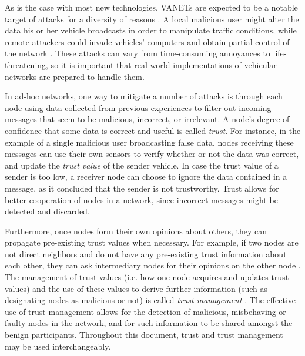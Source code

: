 As is the case with most new technologies, VANETs are expected to be a notable target of attacks for a diversity of reasons \citep{isaac2010security}.
A local malicious user might alter the data his or her vehicle broadcasts in order to manipulate traffic conditions, while remote attackers could invade vehicles' computers and obtain partial control of the network  \citep{garip2015congestion}.
These attacks can vary from time-consuming annoyances to life-threatening, so it is important that real-world implementations of vehicular networks are prepared to handle them.




In ad-hoc networks, one way to mitigate a number of attacks is through each node using data collected from previous experiences to filter out incoming messages that seem to be malicious, incorrect, or irrelevant.
A node's degree of confidence that some data is correct and useful is called \textit{trust}.
For instance, in the example of a single malicious user broadcasting false data, nodes receiving these messages can use their own sensors to verify whether or not the data was correct, and update the \textit{trust value} of the sender vehicle.
In case the trust value of a sender is too low, a receiver node can choose to ignore the data contained in a message, as it concluded that the sender is not trustworthy.
Trust allows for better cooperation of nodes in a network, since incorrect messages might be detected and discarded.

Furthermore, once nodes form their own opinions about others, they can propagate pre-existing trust values when necessary.
For example, if two nodes are not direct neighbors and do not have any pre-existing trust information about each other, they can ask intermediary nodes for their opinions on the other node \citep{wang2009trust}.
The management of trust values (i.e. how one node acquires and updates trust values) and the use of these values to derive further information (such as designating nodes as malicious or not) is called \textit{trust management} \citep{ma2011survey}. 
The effective use of trust management allows for the detection of malicious, misbehaving or faulty nodes in the network, and for such information to be shared amongst the benign participants. 
Throughout this document, trust and trust management may be used interchangeably.

